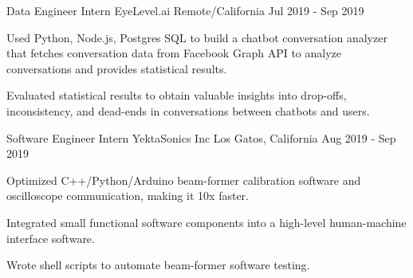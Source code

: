 

\begin{cventries}

  \cventry
    {Data Engineer Intern} %
    {EyeLevel.ai} %
    {Remote/California} %
    {Jul 2019 - Sep 2019} %
    {
	\begin{cvitems} %
      	\item Used Python, Node.js, Postgres SQL to build a chatbot conversation analyzer that fetches conversation data from Facebook Graph API to analyze conversations and provides statistical results.
      	\item Evaluated statistical results to obtain valuable insights into drop-offs, inconsistency, and dead-ends in conversations between chatbots and users.
	\end{cvitems}
    }
    
  \cventry
    {Software Engineer Intern} %
    {YektaSonics Inc} %
    {Los Gatos, California} %
    {Aug 2019 - Sep 2019} %
    {
	\begin{cvitems} %
      	\item Optimized C++/Python/Arduino beam-former calibration software and oscilloscope communication, making it 10x faster.
      	\item Integrated small functional software components into a high-level human-machine interface software. 
      	\item Wrote shell scripts to automate beam-former software testing.
	\end{cvitems}
    }
    

\end{cventries}
